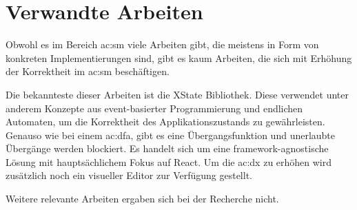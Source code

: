 \chapter{Verwandte Arbeiten}

Obwohl es im Bereich \acrlong{ac:sm} viele Arbeiten gibt, die meistens in Form von konkreten Implementierungen sind, gibt es kaum Arbeiten, die sich mit Erhöhung der Korrektheit im \acrshort{ac:sm} beschäftigen.

Die bekannteste dieser Arbeiten ist die XState Bibliothek. Diese verwendet unter anderem Konzepte aus event-basierter Programmierung und endlichen Automaten, um die Korrektheit des Applikationszustands zu gewährleisten. Genauso wie bei einem \acrshort{ac:dfa}, gibt es eine Übergangsfunktion und unerlaubte Übergänge werden blockiert. Es handelt sich um eine framework-agnostische Lösung mit hauptsächlichem Fokus auf React. Um die \acrlong{ac:dx} zu erhöhen wird zusätzlich noch ein visueller Editor zur Verfügung gestellt.\cite{xstate}

Weitere relevante Arbeiten ergaben sich bei der Recherche nicht.
